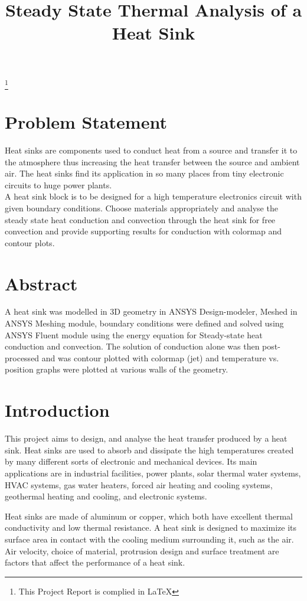 \documentclass{article}
\title{Steady State Thermal Analysis of a Heat Sink}
\author{}
\date{}
\newcommand\blfootnote[1]{%
  \begingroup
  \renewcommand\thefootnote{}\footnote{#1}%
  \addtocounter{footnote}{-1}%
  \endgroup
}
\begin{document}
\onehalfspacing
\maketitle
{}
\tableofcontents
\blfootnote{\Large{This Project Report is complied in \LaTeX}}
\newpage
{}
\section{Problem Statement}
Heat sinks are components used to conduct heat from a source and transfer it to the atmosphere thus increasing the heat transfer between the source and ambient air. The heat sinks find its application in so many places from tiny electronic circuits to huge power plants.\\ A heat sink block is to be designed for a high temperature electronics circuit with given boundary conditions. Choose materials appropriately and analyse the steady state heat conduction and convection through the heat sink for free convection and provide supporting results for conduction with colormap and contour plots. 
\section{Abstract}
A heat sink was modelled in 3D geometry in ANSYS Design-modeler, Meshed in ANSYS Meshing module, boundary conditions were defined and solved using ANSYS Fluent module using the energy equation for Steady-state heat conduction and convection. The solution of conduction alone was then post-processed and was contour plotted with colormap (jet) and temperature vs. position graphs were plotted at various walls of the geometry. 

\section{Introduction}
This project aims to design, and analyse the heat transfer produced by a heat sink. Heat sinks are used to absorb and dissipate the high temperatures created by many different sorts of electronic and mechanical devices. Its main applications are in industrial facilities, power plants, solar thermal water systems, HVAC systems, gas water heaters, forced air heating and cooling systems, geothermal heating and cooling, and electronic systems. 

Heat sinks are made of aluminum or copper, which both have excellent thermal conductivity and low thermal resistance. A heat sink is designed to maximize its surface area in contact with the cooling medium surrounding it, such as the air. Air velocity, choice of material, protrusion design and surface treatment are factors that affect the performance of a heat sink. 
\end{document}
